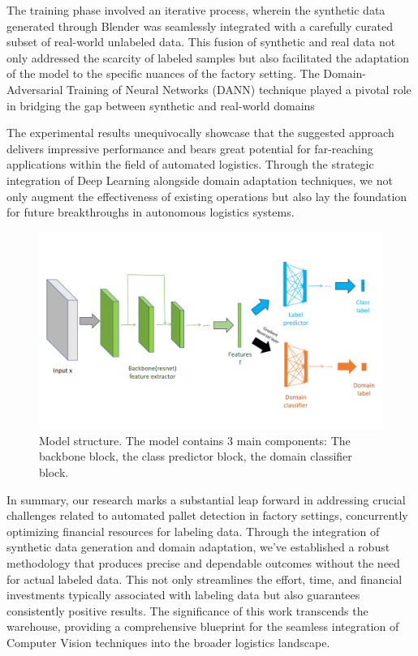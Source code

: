 \documentclass[nonacm, sigconf]{acmart}
\begin{document}
\noindent The training phase involved an iterative process, wherein the synthetic data generated through Blender was seamlessly integrated with a carefully curated subset of real-world unlabeled data. This fusion of synthetic and real data not only addressed the scarcity of labeled samples but also facilitated the adaptation of the model to the specific nuances of the factory setting. The Domain-Adversarial Training of Neural Networks (DANN) technique played a pivotal role in bridging the gap between synthetic and real-world domains

\noindent The experimental results unequivocally showcase that the suggested approach delivers impressive performance and bears great potential for far-reaching applications within the field of automated logistics. Through the strategic integration of Deep Learning alongside domain adaptation techniques, we not only augment the effectiveness of existing operations but also lay the foundation for future breakthroughs in autonomous logistics systems.
\begin{figure}
  \centering
  \includegraphics[width=1\textwidth]{images/model.png}
  \caption{Model structure. The model contains 3 main components: The backbone block, the class predictor block, the domain classifier block.}
  \label{fig:your-image}
\end{figure}
\noindent In summary, our research marks a substantial leap forward in addressing crucial challenges related to automated pallet detection in factory settings, concurrently optimizing financial resources for labeling data. Through the integration of synthetic data generation and domain adaptation, we've established a robust methodology that produces precise and dependable outcomes without the need for actual labeled data. This not only streamlines the effort, time, and financial investments typically associated with labeling data but also guarantees consistently positive results. The significance of this work transcends the warehouse, providing a comprehensive blueprint for the seamless integration of Computer Vision techniques into the broader logistics landscape.
\end{document}
